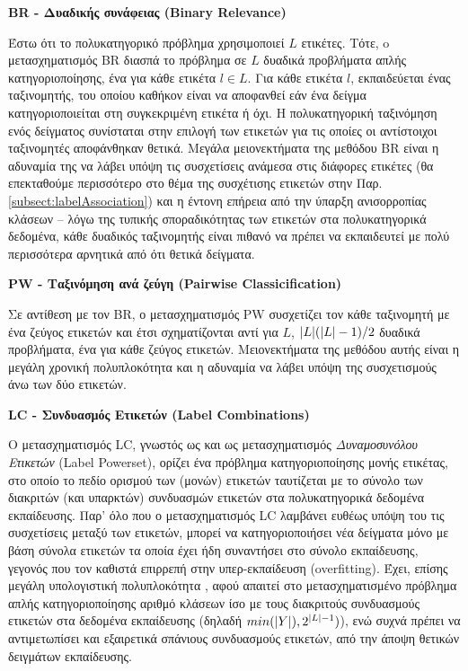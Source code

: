 \begin{description}
\item \textbf{BR - Δυαδικής συνάφειας (Binary Relevance)}

Έστω ότι το πολυκατηγορικό πρόβλημα χρησιμοποιεί $L$ ετικέτες. Τότε, o μετασχηματισμός BR διασπά το πρόβλημα σε $L$ δυαδικά προβλήματα απλής κατηγοριοποίησης, ένα για κάθε ετικέτα $l \in L$. Για κάθε ετικέτα $l$, εκπαιδεύεται ένας ταξινομητής, του οποίου καθήκον είναι να αποφανθεί εάν ένα δείγμα κατηγοριοποιείται στη συγκεκριμένη ετικέτα ή όχι. Η πολυκατηγορική ταξινόμηση ενός δείγματος συνίσταται στην επιλογή των ετικετών για τις οποίες οι αντίστοιχοι ταξινομητές αποφάνθηκαν θετικά. Μεγάλα μειονεκτήματα της μεθόδου BR είναι η αδυναμία της να λάβει υπόψη τις συσχετίσεις ανάμεσα στις διάφορες ετικέτες \citep{yan2007, read2010scalable} (θα επεκταθούμε περισσότερο στο θέμα της συσχέτισης ετικετών στην Παρ. \ref{subsect:labelAssociation}) και η έντονη επήρεια από την ύπαρξη ανισορροπίας κλάσεων \cite{raez2004} -- λόγω της τυπικής σποραδικότητας των ετικετών στα πολυκατηγορικά δεδομένα, κάθε δυαδικός ταξινομητής είναι πιθανό να πρέπει να εκπαιδευτεί με πολύ περισσότερα αρνητικά από ότι θετικά δείγματα.

\item \textbf{PW - Ταξινόμηση ανά ζεύγη (Pairwise Classicification)}

Σε αντίθεση με τον BR, ο μετασχηματισμός PW συσχετίζει τον κάθε ταξινομητή με ένα ζεύγος ετικετών και έτσι σχηματίζονται αντί για $L$, $\lvert L\rvert (\lvert L\rvert - 1) / 2$ δυαδικά προβλήματα, ένα για κάθε ζεύγος ετικετών. Μειονεκτήματα της μεθόδου αυτής είναι η μεγάλη χρονική πολυπλοκότητα και η αδυναμία να λάβει υπόψη της συσχετισμούς άνω των δύο ετικετών.

\item \textbf{LC - Συνδυασμός Ετικετών (Label Combinations)}

Ο μετασχηματισμός LC, γνωστός ως και ως μετασχηματισμός \textit{Δυναμοσυνόλου Ετικετών} (Label Powerset), ορίζει ένα πρόβλημα κατηγοριοποίησης μονής ετικέτας, στο οποίο το πεδίο ορισμού των (μονών) ετικετών ταυτίζεται με το σύνολο των διακριτών (και υπαρκτών) συνδυασμών ετικετών στα πολυκατηγορικά δεδομένα εκπαίδευσης. Παρ' όλο που ο μετασχηματισμός LC λαμβάνει ευθέως υπόψη του τις συσχετίσεις μεταξύ των ετικετών, μπορεί να κατηγοριοποιήσει νέα δείγματα μόνο με βάση σύνολα ετικετών τα οποία έχει ήδη συναντήσει στο σύνολο εκπαίδευσης, γεγονός που τον καθιστά επιρρεπή στην υπερ-εκπαίδευση (overfitting). Έχει, επίσης μεγάλη υπολογιστική πολυπλοκότητα \citep{tsoumakas2007random, read2008multi}, αφού απαιτεί στο μετασχηματισμένο πρόβλημα απλής κατηγοριοποίησης αριθμό κλάσεων ίσο με τους διακριτούς συνδυασμούς ετικετών στα δεδομένα εκπαίδευσης (δηλαδή $min(\lvert Y\rvert), 2^{\lvert L\rvert-1})$), ενώ συχνά πρέπει να αντιμετωπίσει και εξαιρετικά σπάνιους συνδυασμούς ετικετών, από την άποψη θετικών δειγμάτων εκπαίδευσης.


\end{description}

